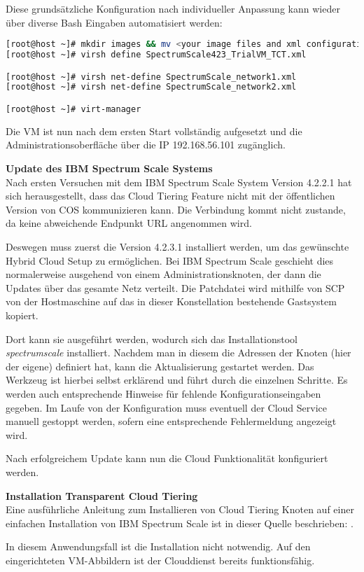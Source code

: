 Diese grundsätzliche Konfiguration nach individueller Anpassung kann wieder über diverse Bash Eingaben automatisiert werden: \\

\begin{lstlisting}[language=bash, caption=Portierung des VM Abbilds]
[root@host ~]# mkdir images && mv <your image files and xml configuration> images
[root@host ~]# virsh define SpectrumScale423_TrialVM_TCT.xml 

[root@host ~]# virsh net-define SpectrumScale_network1.xml
[root@host ~]# virsh net-define SpectrumScale_network2.xml

[root@host ~]# virt-manager
\end{lstlisting}

Die VM ist nun nach dem ersten Start vollständig aufgesetzt und die Administrationsoberfläche über die IP 192.168.56.101 zugänglich.

\textbf{Update des IBM Spectrum Scale Systems}\\
Nach ersten Versuchen mit dem IBM Spectrum Scale System Version 4.2.2.1 hat sich herausgestellt, dass das Cloud Tiering Feature nicht mit der öffentlichen Version von \acs{COS} kommunizieren kann. Die Verbindung kommt nicht zustande, da keine abweichende Endpunkt URL angenommen wird.

Deswegen muss zuerst die Version 4.2.3.1 installiert werden, um das gewünschte Hybrid Cloud Setup zu ermöglichen. Bei IBM Spectrum Scale geschieht dies normalerweise ausgehend von einem Administrationsknoten, der dann die Updates über das gesamte Netz verteilt. Die Patchdatei wird mithilfe von \ac{SCP} von der Hostmaschine auf das in dieser Konstellation bestehende Gastsystem kopiert.	

Dort kann sie ausgeführt werden, wodurch sich das Installationstool \textit{spectrumscale} installiert. Nachdem man in diesem die Adressen der Knoten (hier der eigene) definiert hat, kann die Aktualisierung gestartet werden. Das Werkzeug ist hierbei selbst erklärend und führt durch die einzelnen Schritte. Es werden auch entsprechende Hinweise für fehlende Konfigurationseingaben gegeben.
Im Laufe von der Konfiguration muss eventuell der Cloud Service manuell gestoppt werden, sofern eine entsprechende Fehlermeldung angezeigt wird.

Nach erfolgreichem Update kann nun die Cloud Funktionalität konfiguriert werden.

\textbf{Installation Transparent Cloud Tiering}\\

Eine ausführliche Anleitung zum Installieren von Cloud Tiering Knoten auf einer einfachen Installation von IBM Spectrum Scale ist in dieser Quelle beschrieben: \cite{mani.2017}.

In diesem Anwendungsfall ist die Installation nicht notwendig. Auf den eingerichteten VM-Abbildern ist der Clouddienst bereits funktionsfähig.

